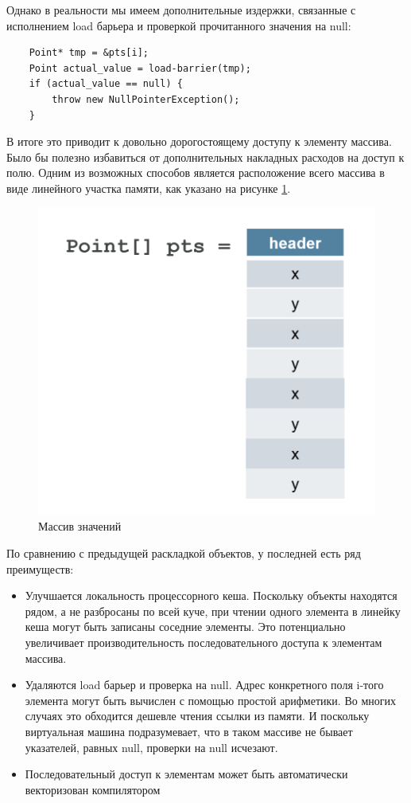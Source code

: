 Однако в реальности мы имеем дополнительные издержки, связанные с исполнением load барьера и проверкой прочитанного значения на null:
\begin{lstlisting}
	Point* tmp = &pts[i];
	Point actual_value = load-barrier(tmp);
	if (actual_value == null) {
		throw new NullPointerException();
	}
\end{lstlisting}
В итоге это приводит к довольно дорогостоящему доступу к элементу массива. Было бы полезно избавиться от дополнительных накладных расходов на доступ к полю. Одним из возможных способов является расположение всего массива в виде линейного участка памяти, как указано на рисунке \ref{values-graph}.

\begin{figure}[h]
	\includegraphics[width=0.65\linewidth]{image/flattened-points.png}
	\caption{Массив значений}\label{values-graph}
\end{figure}
По сравнению с предыдущей раскладкой объектов, у последней есть ряд преимуществ:
\begin{itemize}
	\item Улучшается локальность процессорного кеша. Поскольку объекты находятся рядом, а не разбросаны по всей куче, при чтении одного элемента в линейку кеша могут быть записаны соседние элементы. Это потенциально увеличивает производительность последовательного доступа к элементам массива.
	\item Удаляются load барьер и проверка на null. Адрес конкретного поля i-того элемента могут быть вычислен с помощью простой арифметики. Во многих случаях это обходится дешевле чтения ссылки из памяти. И поскольку виртуальная машина подразумевает, что в таком массиве не бывает указателей, равных null, проверки на null исчезают.
	\item Последовательный доступ к элементам может быть автоматически векторизован компилятором
\end{itemize}
